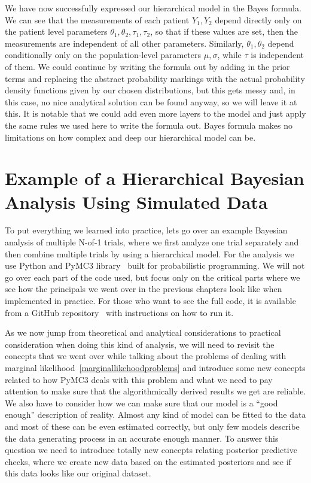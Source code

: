\documentclass[12pt,a4paper,leqno]{report}
\theoremstyle{plain}
\theoremstyle{definition}
\theoremstyle{remark}
\begin{document}
We have now successfully expressed our hierarchical model in the Bayes formula.
We can see that the measurements of each patient \(Y_1, Y_2\) depend directly only on the patient
level parameters \(\theta_1, \theta_2, \tau_1, \tau_2\), so that if these values are set, then the
measurements are independent of all other parameters. Similarly, \(\theta_1, \theta_2 \) depend conditionally only
on the population-level parameters \(\mu, \sigma \), while \(\tau \) is independent of
them. We could continue by writing the
formula out by adding in the prior terms and replacing the abstract probability
markings with the actual probability density functions given by our chosen
distributions, but this gets messy and, in this case, no nice analytical solution can be
found anyway, so we will leave it at this. It is notable that we could add even
more layers to the model and just apply the same rules we used here to write the formula
out. Bayes formula makes no limitations on how complex and deep our hierarchical model
can be.


\chapter{Example of a Hierarchical Bayesian Analysis Using Simulated Data}

To put everything we learned into practice, lets go over an example Bayesian
analysis of multiple N-of-1 trials, where we first analyze one trial separately and then
combine multiple trials by using a hierarchical model. For the analysis we use Python and PyMC3 library\ \cite{pymc3} built
for probabilistic programming. We will not go over each part of the code used, but focus only
on the critical parts where we see how the principals we went over in the
previous chapters look like when implemented in practice. For those who want to see the
full code, it is available from a GitHub repository\ \cite{github} with instructions on how
to run it.

As we now jump from theoretical and analytical considerations to practical consideration
when doing this kind of analysis, we will need to revisit the concepts that we went over
while talking about the problems of dealing with marginal likelihood\
\ref{marginallikehoodproblems} and introduce some new concepts related to how
PyMC3 deals with this problem and what we need to pay attention to
make sure that the algorithmically derived results we get are reliable. We also have to
consider how we can make sure that our model is a ``good enough'' description of reality.
Almost any kind of model can be fitted to the data and most of these can be even
estimated correctly, but only few models describe the data generating process in an
accurate enough manner. To answer this question we need to introduce totally new concepts
relating posterior predictive checks, where we create new data based on the estimated
posteriors and see if this data looks like our original dataset.
\end{document}
